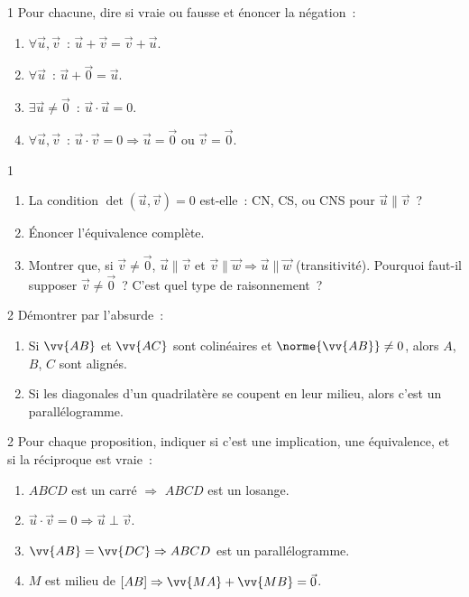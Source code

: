 \begin{exo}{1}
Pour chacune, dire si vraie ou fausse et \'enoncer la n\'egation~:
\begin{enumerate}
  \item $\forall\vec{u},\vec{v}$~: $\vec{u}+\vec{v}=\vec{v}+\vec{u}$.
  \item $\forall\vec{u}$~: $\vec{u}+\vec{0}=\vec{u}$.
  \item $\exists\vec{u}\ne\vec{0}$~: $\vec{u}\cdot\vec{u}=0$.
  \item $\forall\vec{u},\vec{v}$~: $\vec{u}\cdot\vec{v}=0\Rightarrow\vec{u}=\vec{0}$ ou $\vec{v}=\vec{0}$.
\end{enumerate}
\end{exo}

\begin{exo}{1}
\begin{enumerate}
  \item La condition $\det(\vec{u},\vec{v})=0$ est-elle~: CN, CS, ou CNS pour $\vec{u}\parallel\vec{v}$~?
  \item \'Enoncer l'\'equivalence compl\`ete.
  \item Montrer que, si $\vec{v}\ne\vec{0}$, $\vec{u}\parallel\vec{v}$ et $\vec{v}\parallel\vec{w}\Rightarrow\vec{u}\parallel\vec{w}$
        (transitivit\'e). Pourquoi faut-il supposer $\vec{v}\ne\vec{0}$~? C'est quel type de raisonnement~?
\end{enumerate}
\end{exo}

\begin{exo}{2}
D\'emontrer par l'absurde~:
\begin{enumerate}
  \item Si $\vv{AB}$ et $\vv{AC}$ sont colin\'eaires et $\norme{\vv{AB}}\ne0$,
        alors $A$, $B$, $C$ sont align\'es.
  \item Si les diagonales d'un quadrilat\`ere se coupent en leur milieu,
        alors c'est un parall\'elogramme.
\end{enumerate}
\end{exo}

\begin{exo}{2}
Pour chaque proposition, indiquer si c'est une implication, une \'equivalence,
et si la r\'eciproque est vraie~:
\begin{enumerate}
  \item \og $ABCD$ est un carr\'e $\Rightarrow$ $ABCD$ est un losange.\fg
  \item \og $\vec{u}\cdot\vec{v}=0 \Rightarrow \vec{u}\perp\vec{v}$.\fg
  \item \og $\vv{AB}=\vv{DC} \Rightarrow ABCD$ est un parall\'elogramme.\fg
  \item \og $M$ est milieu de $[AB] \Rightarrow \vv{MA}+\vv{MB}=\vec{0}$.\fg
\end{enumerate}
\end{exo}

